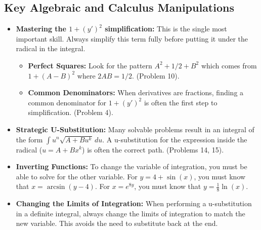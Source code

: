 \documentclass{article}
\begin{document}
\begin{enumerate}
\subsection{Key Algebraic and Calculus Manipulations}
\begin{itemize}
    \item \textbf{Mastering the $1+(y')^2$ simplification:} This is the single most important skill. Always simplify this term fully before putting it under the radical in the integral.
        \begin{itemize}
            \item \textbf{Perfect Squares:} Look for the pattern $A^2 + 1/2 + B^2$ which comes from $1 + (A - B)^2$ where $2AB=1/2$. (Problem 10).
            \item \textbf{Common Denominators:} When derivatives are fractions, finding a common denominator for $1+(y')^2$ is often the first step to simplification. (Problem 4).
        \end{itemize}
    \item \textbf{Strategic U-Substitution:} Many solvable problems result in an integral of the form $\int u^n \sqrt{A+Bu^k} \,du$. A u-substitution for the expression inside the radical ($u=A+Bx^k$) is often the correct path. (Problems 14, 15).
    \item \textbf{Inverting Functions:} To change the variable of integration, you must be able to solve for the other variable. For $y=4+\sin(x)$, you must know that $x=\arcsin(y-4)$. For $x=e^{8y}$, you must know that $y=\frac{1}{8}\ln(x)$.
    \item \textbf{Changing the Limits of Integration:} When performing a u-substitution in a definite integral, always change the limits of integration to match the new variable. This avoids the need to substitute back at the end.
\end{itemize}


\end{enumerate}
\end{document}
